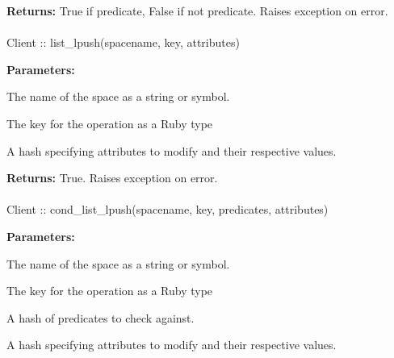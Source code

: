 \noindent\textbf{Returns:}
True if predicate, False if not predicate.  Raises exception on error.

\paragraph{}
\label{api:ruby:list_lpush}
\begin{ccode}
Client :: list_lpush(spacename, key, attributes)
\end{ccode}
\funcdesc 

\noindent\textbf{Parameters:}
\begin{description}[labelindent=\widthof{{\code{attributes}}},leftmargin=*,noitemsep,nolistsep,align=right]
\item[\code{spacename}] The name of the space as a string or symbol.
\item[\code{key}] The key for the operation as a Ruby type
\item[\code{attributes}] A hash specifying attributes to modify and their respective values.
\end{description}

\noindent\textbf{Returns:}
True.  Raises exception on error.

\paragraph{}
\label{api:ruby:cond_list_lpush}
\begin{ccode}
Client :: cond_list_lpush(spacename, key, predicates, attributes)
\end{ccode}
\funcdesc 

\noindent\textbf{Parameters:}
\begin{description}[labelindent=\widthof{{\code{predicates}}},leftmargin=*,noitemsep,nolistsep,align=right]
\item[\code{spacename}] The name of the space as a string or symbol.
\item[\code{key}] The key for the operation as a Ruby type
\item[\code{predicates}] A hash of predicates to check against.
\item[\code{attributes}] A hash specifying attributes to modify and their respective values.
\end{description}

